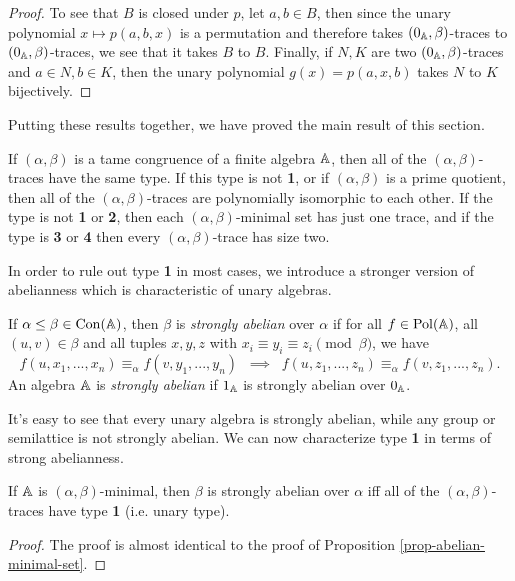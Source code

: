 \begin{appendices}
\begin{proof}
To see that $B$ is closed under $p$, let $a,b \in B$, then since the unary polynomial $x \mapsto p(a,b,x)$ is a permutation and therefore takes $(0_{\mathbb{A}},\beta)$-traces to $(0_{\mathbb{A}},\beta)$-traces, we see that it takes $B$ to $B$. Finally, if $N, K$ are two $(0_{\mathbb{A}},\beta)$-traces and $a \in N, b \in K$, then the unary polynomial $g(x) = p(a,x,b)$ takes $N$ to $K$ bijectively.
\end{proof}

Putting these results together, we have proved the main result of this section.

\begin{thm} If $(\alpha,\beta)$ is a tame congruence of a finite algebra $\mathbb{A}$, then all of the $(\alpha,\beta)$-traces have the same type. If this type is not \textbf{1}, or if $(\alpha,\beta)$ is a prime quotient, then all of the $(\alpha,\beta)$-traces are polynomially isomorphic to each other. If the type is not \textbf{1} or \textbf{2}, then each $(\alpha,\beta)$-minimal set has just one trace, and if the type is \textbf{3} or \textbf{4} then every $(\alpha,\beta)$-trace has size two.
\end{thm}

In order to rule out type \textbf{1} in most cases, we introduce a stronger version of abelianness which is characteristic of unary algebras.

\begin{defn} If $\alpha \le \beta \in \operatorname{Con}(\mathbb{A})$, then $\beta$ is \emph{strongly abelian} over $\alpha$ if for all $f \in \operatorname{Pol}(\mathbb{A})$, all $(u,v) \in \beta$ and all tuples $x, y, z$ with $x_i \equiv y_i \equiv z_i \pmod{\beta}$, we have
\[
f(u,x_1, ..., x_n) \equiv_\alpha f(v, y_1, ..., y_n) \;\; \implies \;\; f(u, z_1, ..., z_n) \equiv_\alpha f(v, z_1, ..., z_n).
\]
An algebra $\mathbb{A}$ is \emph{strongly abelian} if $1_{\mathbb{A}}$ is strongly abelian over $0_{\mathbb{A}}$.
\end{defn}

It's easy to see that every unary algebra is strongly abelian, while any group or semilattice is not strongly abelian. We can now characterize type \textbf{1} in terms of strong abelianness.

\begin{prop} If $\mathbb{A}$ is $(\alpha,\beta)$-minimal, then $\beta$ is strongly abelian over $\alpha$ iff all of the $(\alpha,\beta)$-traces have type \textbf{1} (i.e. unary type).
\end{prop}
\begin{proof} The proof is almost identical to the proof of Proposition \ref{prop-abelian-minimal-set}.
\end{proof}


\end{appendices}
